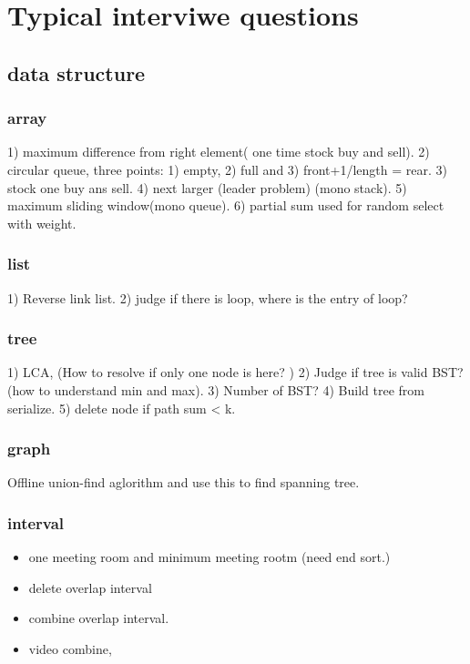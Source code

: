 \documentclass[a4paper,11pt,twoside]{book}
\begin{document}
\section{Typical interviwe questions}
\subsection{data structure}
\subsubsection{array}

\par 1) maximum difference from right element( one time stock buy and sell). 
2) circular queue, three points: 1) empty, 2) full and 3) front+1/length = rear. 		
3) stock one buy ans sell.
4) next larger (leader problem) (mono stack).
5) maximum sliding window(mono queue).
6) partial sum used for random select with weight. 

\subsubsection{list}

\par 1) Reverse link list. 2) judge if there is loop, where is the entry of loop? 

\subsubsection{tree}

\par 1) LCA, (How to resolve if only one node is here? )
2) Judge if tree is valid BST? (how to understand min and max). 
3) Number of BST?  
4) Build tree from serialize.
5) delete node if path sum < k.

\subsubsection{graph}

\par Offline union-find aglorithm and use this to find spanning tree.

\subsubsection{interval}

\begin{itemize}
	\item one meeting room and minimum meeting rootm (need end sort.)
	\item delete overlap interval
	\item combine overlap interval.
	\item video combine, 
\end{itemize}
\end{document}
